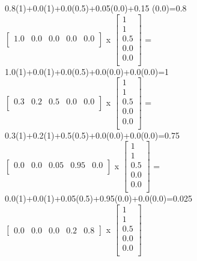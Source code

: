 \documentclass[11pt]{article}
\begin{document}
{\begin{enumerate}
\begin{enumerate}[(a)]
		0.8(1)+0.0(1)+0.0(0.5)+0.05(0.0)+0.15 (0.0)=0.8\\ 
		$\begin{bmatrix} 
			1.0  & 0.0  & 0.0  & 0.0   & 0.0 \\
		\end{bmatrix}$
		x
		$\begin{bmatrix} 
			1  \\  1  \\ 0.5  \\ 0.0 \\ 0.0 \\
		\end{bmatrix}$
		=
		1.0(1)+0.0(1)+0.0(0.5)+0.0(0.0)+0.0(0.0)=1\\ 
		$\begin{bmatrix} 
			0.3  & 0.2  & 0.5  & 0.0   & 0.0 \\
		\end{bmatrix}$ 
		x
		$\begin{bmatrix} 
			1  \\  1  \\ 0.5  \\ 0.0 \\ 0.0 \\
		\end{bmatrix}$
		=
		0.3(1)+0.2(1)+0.5(0.5)+0.0(0.0)+0.0(0.0)=0.75\\ 
		$\begin{bmatrix} 
			0.0  & 0.0  & 0.05 & 0.95 & 0.0 \\
		\end{bmatrix}$
		x
		$\begin{bmatrix} 
			1  \\  1  \\ 0.5  \\ 0.0 \\ 0.0 \\
		\end{bmatrix}$
		=
		0.0(1)+0.0(1)+0.05(0.5)+0.95(0.0)+0.0(0.0)=0.025\\ 
		$\begin{bmatrix} 
			0.0  & 0.0  & 0.0  & 0.2  & 0.8 
		\end{bmatrix}$
		x
		$\begin{bmatrix} 
			1  \\  1  \\ 0.5  \\ 0.0 \\ 0.0 \\
		\end{bmatrix}$

\end{enumerate}
\end{enumerate}}
\end{document}
